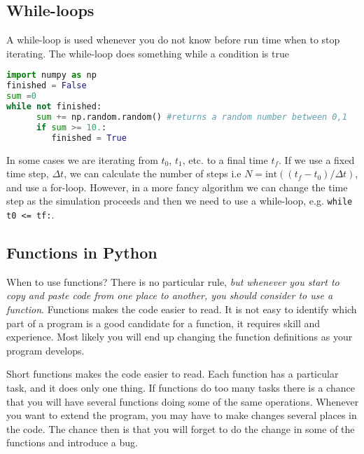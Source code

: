 \documentclass[graybox,sectrefs,envcountresetchap,open=right,final]{svmonodo}
\newenvironment{graybox2admon}[1][]{
\begin{graybox2mdframed}[frametitle=#1]
}
{
\end{graybox2mdframed}
}
\begin{document}
\subsection{While-loops}
A while-loop is used whenever you do not know before run time when to stop iterating. The while-loop does something while a condition is true








\begin{lstlisting}[language=python,style=blue1bar]
import numpy as np
finished = False
sum =0
while not finished:
      sum += np.random.random() #returns a random number between 0,1
      if sum >= 10.:
      	 finished = True

\end{lstlisting}

In some cases we are iterating from $t_0$, $t_1$, etc. to a final time $t_f$. If we use a fixed time step, $\Delta t$, we can calculate the number of steps i.e $N= \text{int} ((t_f-t_0)/\Delta t)$, and use a for-loop. However, in a more fancy algorithm we can change the time step as the simulation proceeds and then we need to use a while-loop, e.g. \texttt{while t0 <= tf:}. 
\subsection{Functions in Python}
When to use functions? There is no particular rule, \emph{but whenever you
start to copy and paste code from one place to another, you should
consider to use a function}. Functions makes the code easier to read.
It is not easy to identify which part of a program is a good candidate
for a function, it requires skill and experience. Most likely you will
end up changing the function definitions as your program develops.



\begin{graybox2admon}[Use short functions]
Short functions makes the code easier to read. Each function has a particular task, and it does only one thing. If functions do too many tasks there is a chance that you will have several functions doing some of the same operations. Whenever you want to extend the program, you may have to make changes several places in the code. The chance then is that you will forget to do the change in some of the functions and introduce a bug.
\end{graybox2admon}
\end{document}
